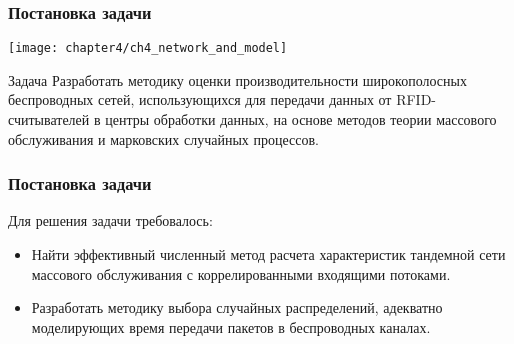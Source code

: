 \begin{frame}
    \frametitle{Постановка задачи}
    \begin{center}
        \texttt{[image: chapter4/ch4\_network\_and\_model]}
    \end{center}
    \small
    \begin{alertblock}{Задача}
        Разработать методику оценки производительности широкополосных беспроводных сетей, использующихся для передачи данных от RFID-считывателей в центры обработки данных, на основе методов теории массового обслуживания и марковских случайных процессов.
    \end{alertblock}
\end{frame}

\begin{frame}
    \frametitle{Постановка задачи}
    Для решения задачи требовалось:
    \begin{itemize}
        \item Найти эффективный численный метод расчета характеристик тандемной сети массового обслуживания с коррелированными входящими потоками.
        \item Разработать методику выбора случайных распределений, адекватно моделирующих время передачи пакетов в беспроводных каналах.
    \end{itemize}
    \vfill
\end{frame}

